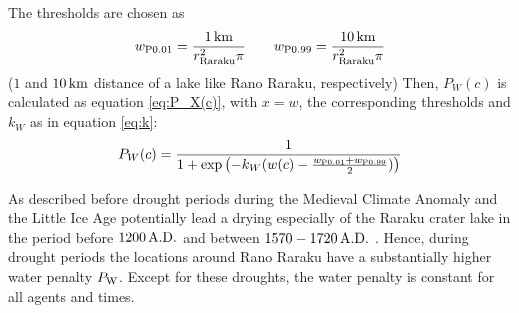 The thresholds are chosen as 
\begin{equation}
w_{\rm P0.01} = \frac{1\, {\rm km}}{r_\text{Raraku}^2\pi} \qquad
 w_{\rm P0.99}=\frac{10\, {\rm km}}{r_\text{Raraku}^2\pi}
\end{equation} 
($1$ and $10\, {\rm km}$ distance of a lake like Rano Raraku, respectively)
Then, $P_W(c)$ is calculated as equation \ref{eq:P_X(c)}, with $x=w$, the corresponding thresholds and $k_W$ as in equation \ref{eq:k}:
\begin{equation}
	P_W(c) = \frac{1}{1+\exp\left( - k_W (w(c)-\frac{w_{\rm P0.01}+w_{\rm P0.99}}{2}) \right)}
\end{equation}

As described before drought periods during the Medieval Climate Anomaly and the Little Ice Age potentially lead a drying especially of the Raraku crater lake in the period before $1200\, {\rm A.D.}$ and between $1570-1720 \, {\rm A.D.}$ \citep{Rull2020}. 
Hence, during drought periods the locations around Rano Raraku have a substantially higher water penalty $P_{\rm W}$.
Except for these droughts, the water penalty is constant for all agents and times.

